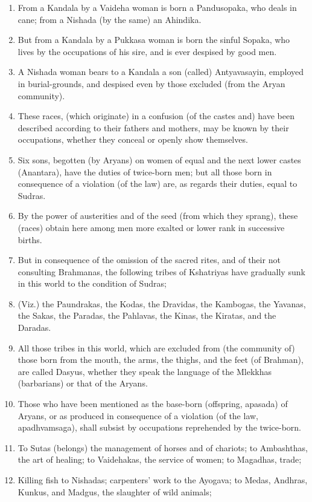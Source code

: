 \begin{enumerate}
\item From a Kandala by a Vaideha woman is born a Pandusopaka, who deals in cane; from a Nishada (by the same) an Ahindika.
\item But from a Kandala by a Pukkasa woman is born the sinful Sopaka, who lives by the occupations of his sire, and is ever despised by good men.
\item A Nishada woman bears to a Kandala a son (called) Antyavasayin, employed in burial-grounds, and despised even by those excluded (from the Aryan community).
\item These races, (which originate) in a confusion (of the castes and) have been described according to their fathers and mothers, may be known by their occupations, whether they conceal or openly show themselves.
\item Six sons, begotten (by Aryans) on women of equal and the next lower castes (Anantara), have the duties of twice-born men; but all those born in consequence of a violation (of the law) are, as regards their duties, equal to Sudras.
\item By the power of austerities and of the seed (from which they sprang), these (races) obtain here among men more exalted or lower rank in successive births.
\item But in consequence of the omission of the sacred rites, and of their not consulting Brahmanas, the following tribes of Kshatriyas have gradually sunk in this world to the condition of Sudras;
\item (Viz.) the Paundrakas, the Kodas, the Dravidas, the Kambogas, the Yavanas, the Sakas, the Paradas, the Pahlavas, the Kinas, the Kiratas, and the Daradas.
\item All those tribes in this world, which are excluded from (the community of) those born from the mouth, the arms, the thighs, and the feet (of Brahman), are called Dasyus, whether they speak the language of the Mlekkhas (barbarians) or that of the Aryans.
\item Those who have been mentioned as the base-born (offspring, apasada) of Aryans, or as produced in consequence of a violation (of the law, apadhvamsaga), shall subsist by occupations reprehended by the twice-born.
\item To Sutas (belongs) the management of horses and of chariots; to Ambashthas, the art of healing; to Vaidehakas, the service of women; to Magadhas, trade;
\item Killing fish to Nishadas; carpenters' work to the Ayogava; to Medas, Andhras, Kunkus, and Madgus, the slaughter of wild animals;

\end{enumerate}
